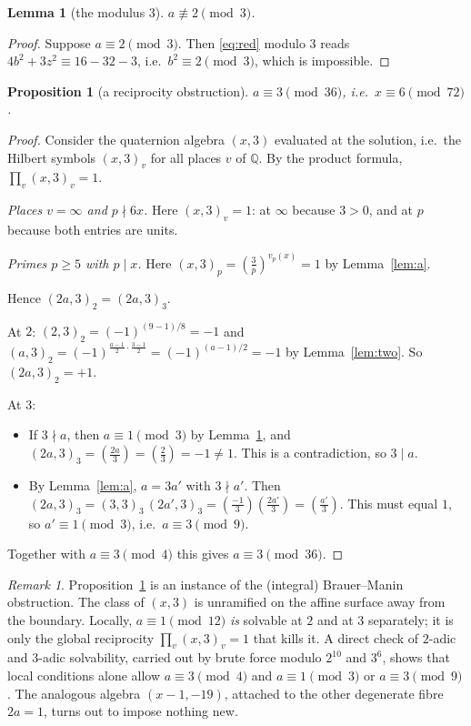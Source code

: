 \documentclass[11pt]{article}
\newtheorem{proposition}[theorem]{Proposition}
\newtheorem{lemma}[theorem]{Lemma}
\theoremstyle{remark}
\newtheorem{remark}[theorem]{Remark}
\theoremstyle{definition}
\newcommand{\Q}{\mathbb{Q}}
\newcommand{\leg}[2]{\left(\frac{#1}{#2}\right)}
\begin{document}
\begin{lemma}[the modulus $3$]\label{lem:three}
$a\not\equiv 2\pmod 3$.
\end{lemma}
\begin{proof}
Suppose $a\equiv2\pmod 3$.  Then \eqref{eq:red} modulo $3$ reads $4b^2+3z^2\equiv 16-32-3$, i.e.\
$b^2\equiv 2\pmod3$, which is impossible.
\end{proof}

\begin{proposition}[a reciprocity obstruction]\label{prop:BM}
$a\equiv 3\pmod{36}$, i.e.\ $x\equiv 6\pmod{72}$.
\end{proposition}
\begin{proof}
Consider the quaternion algebra $(x,3)$ evaluated at the solution, i.e.\ the Hilbert symbols
$(x,3)_v$ for all places $v$ of $\Q$.  By the product formula, $\prod_v (x,3)_v=1$.

\emph{Places $v=\infty$ and $p\nmid 6x$.}  Here $(x,3)_v=1$: at $\infty$ because $3>0$, and at $p$
because both entries are units.

\emph{Primes $p\ge5$ with $p\mid x$.}  Here $(x,3)_p=\leg{3}{p}^{v_p(x)}=1$ by
Lemma~\ref{lem:a}.

Hence $(2a,3)_2=(2a,3)_3$.

At $2$: $(2,3)_2=(-1)^{(9-1)/8}=-1$ and $(a,3)_2=(-1)^{\frac{a-1}{2}\cdot\frac{3-1}{2}}=(-1)^{(a-1)/2}=-1$
by Lemma~\ref{lem:two}.  So $(2a,3)_2=+1$.

At $3$:
\begin{itemize}
\item If $3\nmid a$, then $a\equiv1\pmod3$ by Lemma~\ref{lem:three}, and
  $(2a,3)_3=\leg{2a}{3}=\leg{2}{3}=-1\ne 1$.  This is a contradiction, so $3\mid a$.
\item By Lemma~\ref{lem:a}, $a=3a'$ with $3\nmid a'$.  Then
  $(2a,3)_3=(3,3)_3\,(2a',3)_3=\leg{-1}{3}\leg{2a'}{3}=\leg{a'}{3}$.  This must equal $1$, so
  $a'\equiv1\pmod3$, i.e.\ $a\equiv3\pmod 9$.
\end{itemize}
Together with $a\equiv3\pmod4$ this gives $a\equiv3\pmod{36}$.
\end{proof}

\begin{remark}
Proposition~\ref{prop:BM} is an instance of the (integral) Brauer--Manin obstruction.  The class of
$(x,3)$ is unramified on the affine surface away from the boundary.  Locally, $a\equiv1\pmod{12}$
\emph{is} solvable at $2$ and at $3$ separately; it is only the global reciprocity
$\prod_v(x,3)_v=1$ that kills it.  A direct check of $2$-adic and $3$-adic solvability, carried
out by brute force modulo $2^{10}$ and $3^6$, shows that local conditions alone allow
$a\equiv 3\pmod 4$ and $a\equiv 1\pmod 3$ or $a\equiv 3\pmod 9$.  The analogous algebra
$(x-1,-19)$, attached to the other degenerate fibre $2a=1$, turns out to impose nothing new.
\end{remark}
\end{document}
